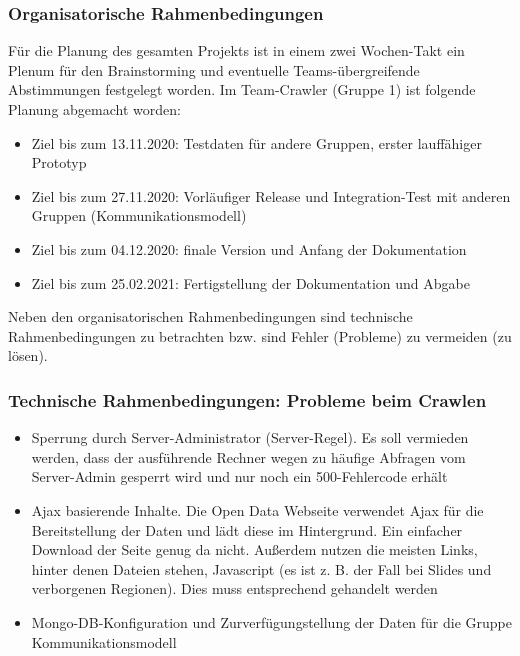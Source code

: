 \subsubsection{Organisatorische Rahmenbedingungen}
Für die Planung des gesamten Projekts ist in einem zwei Wochen-Takt ein Plenum für den Brainstorming und eventuelle Teams-übergreifende Abstimmungen festgelegt worden. Im Team-Crawler (Gruppe 1) ist folgende Planung abgemacht worden:
\begin{itemize}
    \item Ziel bis zum 13.11.2020: Testdaten für andere Gruppen, erster lauffähiger Prototyp
    \item Ziel bis zum 27.11.2020: Vorläufiger Release und Integration-Test mit anderen Gruppen (Kommunikationsmodell)
    \item Ziel bis zum 04.12.2020: finale Version und Anfang der Dokumentation
    \item Ziel bis zum 25.02.2021: Fertigstellung der Dokumentation und Abgabe
\end{itemize}
Neben den organisatorischen Rahmenbedingungen sind technische Rahmenbedingungen zu betrachten bzw. sind Fehler (Probleme) zu vermeiden (zu lösen).
\subsubsection{Technische Rahmenbedingungen: Probleme beim Crawlen}\label{subsubsec:techAnforderungen}
\begin{itemize}
    \item Sperrung durch Server-Administrator (Server-Regel). Es soll vermieden werden, dass der ausführende Rechner wegen zu häufige Abfragen vom Server-Admin gesperrt wird und nur noch ein 500-Fehlercode erhält
    \item Ajax basierende Inhalte. Die Open Data Webseite verwendet Ajax für die Bereitstellung der Daten und lädt diese im Hintergrund. Ein einfacher Download der Seite genug da nicht. Außerdem nutzen die meisten Links, hinter denen Dateien stehen, Javascript (es ist z. B. der Fall bei Slides und verborgenen Regionen). Dies muss entsprechend gehandelt werden
    \item Mongo-DB-Konfiguration und Zurverfügungstellung der Daten für die Gruppe Kommunikationsmodell 
\end{itemize}